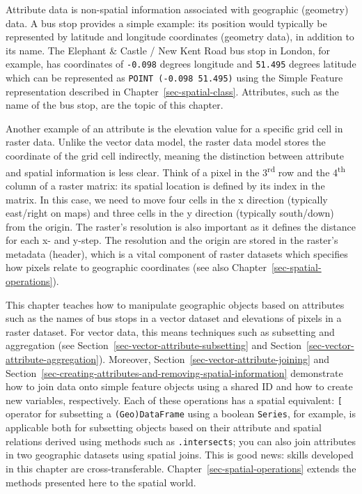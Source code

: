\documentclass[
  letterpaper,
]{krantz}
\begin{document}
Attribute data is non-spatial information associated with geographic
(geometry) data. A bus stop provides a simple example: its position
would typically be represented by latitude and longitude coordinates
(geometry data), in addition to its name. The Elephant \& Castle / New
Kent Road bus stop in London, for example, has coordinates of
\texttt{-0.098} degrees longitude and \texttt{51.495} degrees latitude
which can be represented as \texttt{POINT\ (-0.098\ 51.495)} using the
Simple Feature representation described in
Chapter~\ref{sec-spatial-class}. Attributes, such as the name of the bus
stop, are the topic of this chapter.

Another example of an attribute is the elevation value for a specific
grid cell in raster data. Unlike the vector data model, the raster data
model stores the coordinate of the grid cell indirectly, meaning the
distinction between attribute and spatial information is less clear.
Think of a pixel in the 3\textsuperscript{rd} row and the
4\textsuperscript{th} column of a raster matrix: its spatial location is
defined by its index in the matrix. In this case, we need to move four
cells in the x direction (typically east/right on maps) and three cells
in the y direction (typically south/down) from the origin. The raster's
resolution is also important as it defines the distance for each x- and
y-step. The resolution and the origin are stored in the raster's
metadata (header), which is a vital component of raster datasets which
specifies how pixels relate to geographic coordinates (see also
Chapter~\ref{sec-spatial-operations}).

This chapter teaches how to manipulate geographic objects based on
attributes such as the names of bus stops in a vector dataset and
elevations of pixels in a raster dataset. For vector data, this means
techniques such as subsetting and aggregation (see
Section~\ref{sec-vector-attribute-subsetting} and
Section~\ref{sec-vector-attribute-aggregation}). Moreover,
Section~\ref{sec-vector-attribute-joining} and
Section~\ref{sec-creating-attributes-and-removing-spatial-information}
demonstrate how to join data onto simple feature objects using a shared
ID and how to create new variables, respectively. Each of these
operations has a spatial equivalent: \texttt{{[}} operator for
subsetting a \texttt{(Geo)DataFrame} using a boolean \texttt{Series},
for example, is applicable both for subsetting objects based on their
attribute and spatial relations derived using methods such as
\texttt{.intersects}; you can also join attributes in two geographic
datasets using spatial joins. This is good news: skills developed in
this chapter are cross-transferable.
Chapter~\ref{sec-spatial-operations} extends the methods presented here
to the spatial world.
\end{document}
